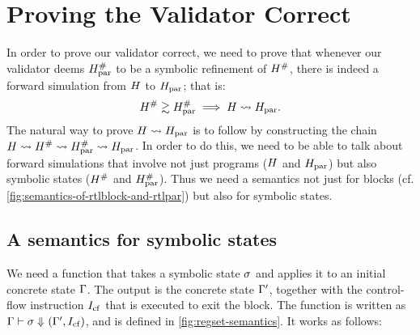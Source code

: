 {\section{Proving the Validator Correct}%
\label{sec:hs:overview-validator-correctness-proof}

In order to prove our validator correct, we need to prove that whenever our
validator deems $H_\text{par}^{\#}$ to be a symbolic refinement of
$H^{\#}$, there is indeed a forward simulation from $H$ to
$H_\text{par}$; that is:
%
\begin{equation}
  H^{\#} \gtrsim H_\text{par}^{\#} \implies H \mathrel{\leadsto} H_\text{par}.
\end{equation}
%
The natural way to prove $H \mathrel{\leadsto} H_\text{par}$ is to follow
\textcite{tristan08_formal_verif_trans_valid} by constructing the chain
$H \mathrel{\leadsto} H^{\#} \mathrel{\leadsto} H_\text{par}^{\#} \mathrel{\leadsto} H_\text{par}$. In
order to do this, we need to be able to talk about forward simulations that
involve not just programs ($H$ and $H_\text{par}$) but also symbolic states
($H^{\#}$ and $H_\text{par}^{\#}$). Thus we need a semantics not just
for blocks (cf. \cref{fig:semantics-of-rtlblock-and-rtlpar}) but also for
symbolic states.

\subsection{A semantics for symbolic states}

We need a function that takes a symbolic state $\sigma$ and applies it to an
initial concrete state $\Gamma$. The output is the concrete state $\Gamma'$,
together with the control-flow instruction $I_{\mathrm{cf}}$ that is executed to exit
the block. The function is written as
$\Gamma \vdash \sigma \Downarrow_{} (\Gamma',I_{\mathrm{cf}})$, and is defined in
\cref{fig:regset-semantics}. It works as follows:


}
